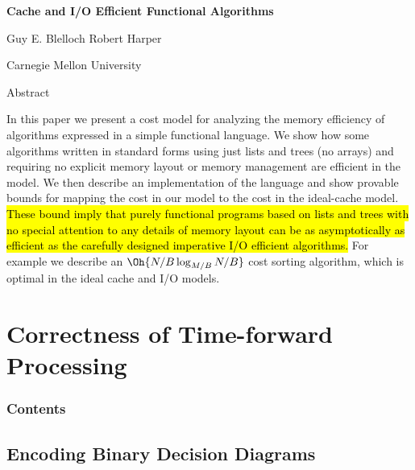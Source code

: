 \documentclass[english, aspectratio=169]{beamer}
\makeatletter
\let\HL\hl
\renewcommand\hl{%
  \let\set@color\beamerorig@set@color
  \let\reset@color\beamerorig@reset@color
  \HL}
\makeatother
\begin{document}
\begin{frame}
  \begin{center}
    {\Large\bf Cache and I/O Efficient Functional Algorithms}

    Guy E. Blelloch \qquad Robert Harper

    {\footnotesize Carnegie Mellon University}
  \end{center}

  \begin{block}{Abstract}
    \justifying \fontsize{8}{9}\selectfont

    In this paper we present a cost model for analyzing the memory efficiency of algorithms
    expressed in a simple functional language. We show how some algorithms written in standard forms
    using just lists and trees (no arrays) and requiring no explicit memory layout or memory
    management are efficient in the model. We then describe an implementation of the language and
    show provable bounds for mapping the cost in our model to the cost in the ideal-cache model.
    \hl{These bound imply that purely functional programs based on lists
      and trees with no special attention to any details of memory layout can be as asymptotically
      as efficient as the carefully designed imperative I/O efficient algorithms.} For example we
    describe an $\Oh{N/B \log_{M/B} N/B}$ cost sorting algorithm, which is optimal in the ideal
    cache and I/O models.
  \end{block}
\end{frame}

\blankframe

\section{Correctness of Time-forward Processing}

\begin{frame}{}
  \frametitle{Contents}
  \tableofcontents
\end{frame}

\subsection{Encoding Binary Decision Diagrams}
\end{document}
